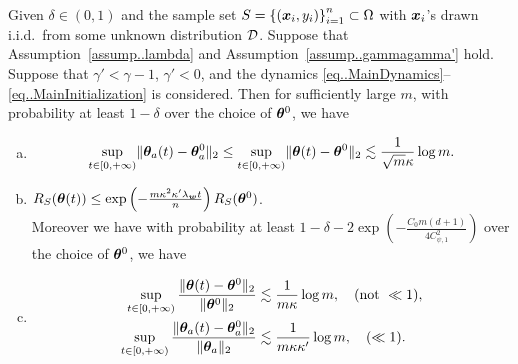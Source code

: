 \documentclass[twoside,11pt]{article}
\begin{document}
\begin{prop}\label{prop..ALazyRegime}
    Given $\delta\in(0,1)$ and the sample set $S = {\{(\bm{x}_i, y_i)\}}_{i=1}^n\subset\Omega$ with $\bm{x}_i$'s drawn i.i.d.\ from some unknown distribution $\mathcal{D}$. Suppose that Assumption~\ref{assump..lambda} and Assumption~\ref{assump..gammagamma'} hold.  Suppose that $\gamma'<\gamma-1$, $\gamma'<0$, and the dynamics \eqref{eq..MainDynamics}--\eqref{eq..MainInitialization} is considered. Then for sufficiently large $m$, with probability at least $1-\delta$ over the choice of $\bm{\theta}^0$, we have
    \begin{enumerate}[(a)]
        \item \begin{equation*}
                  \begin{aligned}
                      \sup\limits_{t\in[0,+\infty)}\lVert\bm{\theta}_{a}(t)-\bm{\theta}_{a}^0\rVert_2
                      \leq \sup\limits_{t\in[0,+\infty)}\lVert\bm{\theta}(t)-\bm{\theta}^0\rVert_2
                      \lesssim\frac{1}{\sqrt{m}\kappa}\log m.
                  \end{aligned}
              \end{equation*}
        \item $R_S(\bm{\theta}(t))\leq\exp\left(-\frac{m\kappa^2\kappa'\lambda_{\bm{w}} t}{n}\right)R_S(\bm{\theta}^0)$. \\
              Moreover we have with probability at least $1-\delta-2\exp\left(-\frac{C_0m(d+1)}{4C_{\psi,1}^2}\right)$ over the choice of $\bm{\theta}^0$, we have
        \item \begin{equation*}
                  \begin{aligned}
                      \sup\limits_{t\in[0,+\infty)}\frac{\lVert\bm{\theta}(t)-\bm{\theta}^0\rVert_2}{\lVert\bm{\theta}^0\rVert_2}
                       & \lesssim\frac{1}{m\kappa}\log m, \quad (\text{not }\ll 1), \\
                      \sup\limits_{t\in[0,+\infty)}\frac{\lVert\bm{\theta}_{a}(t)-\bm{\theta}_{a}^0\rVert_2}{\lVert\bm{\theta}_{a}\rVert_2}
                       & \lesssim\frac{1}{m\kappa\kappa'}\log m, \quad (\ll 1).
                  \end{aligned}
              \end{equation*}
    \end{enumerate}
\end{prop}
\end{document}
